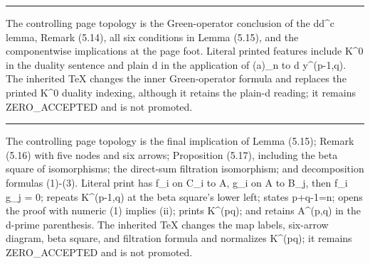 \documentclass[
  english,
  a3paper,
  a3paper]{extarticle}
\begin{document}
\clearpage



\par

\vspace{0.7mm}\hrule\vspace{1.6mm}

\fontsize{11}{14}\selectfont

The controlling page topology is the Green-operator conclusion of the
dd\^{}c lemma, Remark (5.14), all six conditions in Lemma (5.15), and
the componentwise implications at the page foot. Literal printed
features include K\^{}0 in the duality sentence and plain d in the
application of (a)\_n to d y\^{}(p-1,q). The inherited TeX changes the
inner Green-operator formula and replaces the printed K\^{}0 duality
indexing, although it retains the plain-d reading; it remains
ZERO\_ACCEPTED and is not promoted.

\clearpage



\par

\vspace{0.7mm}\hrule\vspace{1.6mm}

\fontsize{11}{14}\selectfont

The controlling page topology is the final implication of Lemma (5.15);
Remark (5.16) with five nodes and six arrows; Proposition (5.17),
including the beta square of isomorphisms; the direct-sum filtration
isomorphism; and decomposition formulas (1)-(3). Literal print has f\_i
on C\_i to A, g\_i on A to B\_j, then f\_i g\_j = 0; repeats
K\^{}(p-1,q) at the beta square's lower left; states p+q-1=n; opens the
proof with numeric (1) implies (ii); prints K\^{}(pq); and retains
A\^{}(p,q) in the d-prime parenthesis. The inherited TeX changes the map
labels, six-arrow diagram, beta square, and filtration formula and
normalizes K\^{}(pq); it remains ZERO\_ACCEPTED and is not promoted.

\clearpage


\end{document}
